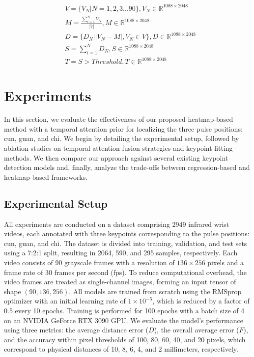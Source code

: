\documentclass[twocolumn]{article}
\begin{document}
\begin{align}
& V=\{V_{N}|N=1, 2, 3...90\},V_{N}\in \mathbb{R}^{1088\times2048}\label{tp1} \\
& M=\frac{\sum_{i=1}^{N} V_{N}}{|V|}, M\in \mathbb{R}^{1088\times2048}\label{tp2} \\
& D=\{D_{N}||V_{N}-M|, V_{N}\in V\}, D\in \mathbb{R}^{1088\times2048}\label{tp3} \\
& S=\sum_{i=1}^{N} D_{N}, S\in \mathbb{R}^{1088\times2048}\label{tp4} \\
& T=S > Threshold, T\in \mathbb{R}^{1088\times2048}\label{tp5}
\end{align}

\section{Experiments}
In this section, we evaluate the effectiveness of our proposed heatmap-based method with a temporal attention prior for localizing the three pulse positions: cun, guan, and chi. We begin by detailing the experimental setup, followed by ablation studies on temporal attention fusion strategies and keypoint fitting methods. We then compare our approach against several existing keypoint detection models and, finally, analyze the trade-offs between regression-based and heatmap-based frameworks.

\subsection{Experimental Setup}
All experiments are conducted on a dataset comprising 2949 infrared wrist videos, each annotated with three keypoints corresponding to the pulse positions: cun, guan, and chi. The dataset is divided into training, validation, and test sets using a 7:2:1 split, resulting in 2064, 590, and 295 samples, respectively. Each video consists of 90 grayscale frames with a resolution of $136 \times 256$ pixels and a frame rate of 30 frames per second (fps). To reduce computational overhead, the video frames are treated as single-channel images, forming an input tensor of shape $(90, 136, 256)$. All models are trained from scratch using the RMSprop optimizer with an initial learning rate of $1 \times 10^{-5}$, which is reduced by a factor of 0.5 every 10 epochs. Training is performed for 100 epochs with a batch size of 4 on an NVIDIA GeForce RTX 3090 GPU. We evaluate the model's performance using three metrics: the average distance error ($D$), the overall average error ($F$), and the accuracy within pixel thresholds of 100, 80, 60, 40, and 20 pixels, which correspond to physical distances of 10, 8, 6, 4, and 2 millimeters, respectively.
\end{document}
